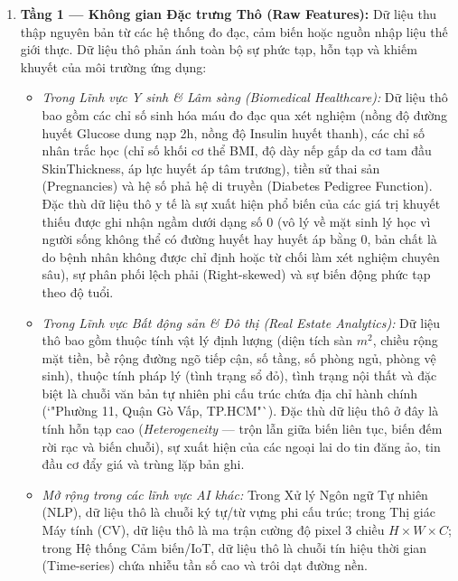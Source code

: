 \documentclass[12pt,a4paper]{report}
\begin{document}
\begin{enumerate}[leftmargin=1.5em]
    \item \textbf{Tầng 1 — Không gian Đặc trưng Thô (Raw Features):} 
    Dữ liệu thu thập nguyên bản từ các hệ thống đo đạc, cảm biến hoặc nguồn nhập liệu thế giới thực. Dữ liệu thô phản ánh toàn bộ sự phức tạp, hỗn tạp và khiếm khuyết của môi trường ứng dụng:
    \begin{itemize}[leftmargin=1.2em]
        \item \textit{Trong Lĩnh vực Y sinh \& Lâm sàng (Biomedical Healthcare):} Dữ liệu thô bao gồm các chỉ số sinh hóa máu đo đạc qua xét nghiệm (nồng độ đường huyết Glucose dung nạp 2h, nồng độ Insulin huyết thanh), các chỉ số nhân trắc học (chỉ số khối cơ thể BMI, độ dày nếp gấp da cơ tam đầu SkinThickness, áp lực huyết áp tâm trương), tiền sử thai sản (Pregnancies) và hệ số phả hệ di truyền (Diabetes Pedigree Function). Đặc thù dữ liệu thô y tế là sự xuất hiện phổ biến của các giá trị khuyết thiếu được ghi nhận ngầm dưới dạng số $0$ (vô lý về mặt sinh lý học vì người sống không thể có đường huyết hay huyết áp bằng $0$, bản chất là do bệnh nhân không được chỉ định hoặc từ chối làm xét nghiệm chuyên sâu), sự phân phối lệch phải (Right-skewed) và sự biến động phức tạp theo độ tuổi.
        \item \textit{Trong Lĩnh vực Bất động sản \& Đô thị (Real Estate Analytics):} Dữ liệu thô bao gồm thuộc tính vật lý định lượng (diện tích sàn $m^2$, chiều rộng mặt tiền, bề rộng đường ngõ tiếp cận, số tầng, số phòng ngủ, phòng vệ sinh), thuộc tính pháp lý (tình trạng sổ đỏ), tình trạng nội thất và đặc biệt là chuỗi văn bản tự nhiên phi cấu trúc chứa địa chỉ hành chính (`"Phường 11, Quận Gò Vấp, TP.HCM"`). Đặc thù dữ liệu thô ở đây là tính hỗn tạp cao (\textit{Heterogeneity} — trộn lẫn giữa biến liên tục, biến đếm rời rạc và biến chuỗi), sự xuất hiện của các ngoại lai do tin đăng ảo, tin đầu cơ đẩy giá và trùng lặp bản ghi.
        \item \textit{Mở rộng trong các lĩnh vực AI khác:} Trong Xử lý Ngôn ngữ Tự nhiên (NLP), dữ liệu thô là chuỗi ký tự/từ vựng phi cấu trúc; trong Thị giác Máy tính (CV), dữ liệu thô là ma trận cường độ pixel 3 chiều $H \times W \times C$; trong Hệ thống Cảm biến/IoT, dữ liệu thô là chuỗi tín hiệu thời gian (Time-series) chứa nhiễu tần số cao và trôi dạt đường nền.
    \end{itemize}


\end{enumerate}
\end{document}
